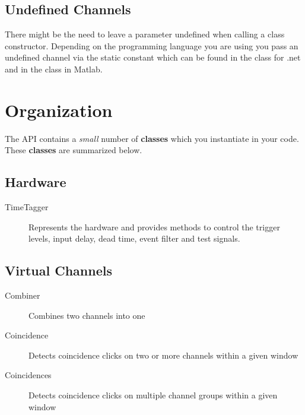 \documentclass[letterpaper,10pt,english]{sphinxmanual}
\begin{document}
\subsection{Undefined Channels}
\label{sections/api:undefined-channels}
There might be the need to leave a parameter undefined when calling a class constructor.
Depending on the programming language you are using you pass an undefined channel via the
static constant  which can be found in the  class for .net and
in the  class in Matlab.


\section{Organization}
\label{sections/api:organization}
The API contains a \emph{small} number of \textbf{classes} which you instantiate in your code.
These \textbf{classes} are summarized below.


\subsection{Hardware}
\label{sections/api:hardware}\begin{description}
\item[{TimeTagger}] \leavevmode
Represents the hardware and provides methods to control the trigger levels, input delay, dead time, event filter and test signals.

\end{description}


\subsection{Virtual Channels}
\label{sections/api:virtual-channels}\begin{description}
\item[{Combiner}] \leavevmode
Combines two channels into one

\item[{Coincidence}] \leavevmode
Detects coincidence clicks on two or more channels within a given window

\item[{Coincidences}] \leavevmode
Detects coincidence clicks on multiple channel groups within a given window

\end{description}
\end{document}
